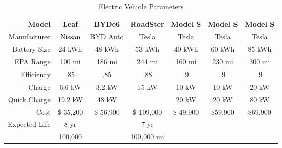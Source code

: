 \begin{table}
\centering
\begin{tabular}{| r |  c c c c c c |}
\hline
\rowcolor[gray]{.8} \bf Model		&	\bf Leaf  		& \bf	 BYDe6   	& 	\bf RoadSter  	& \bf Model S 		&  \bf Model S  & \bf  Model S 	 \\
\hline
 Manufacturer 	&	Nissan		& 	BYD Auto	&	Tesla		&	Tesla		&	Tesla		&	Tesla  	\\
\rowcolor[gray]{.95}Battery Size	&	24 kWh	&	 48 kWh	&	 53 kWh	&	40 kWh	&	60 kWh	&	85 kWh	\\
EPA Range	&	100 mi 		&	186 mi 		&	244 mi  	&	160 mi 		&	230 mi		&	300 mi 		\\
\rowcolor[gray]{.95}Efficiency	&	.85		&	.85		&	.88		&	.9		&	.9		&	.9		\\
Charge		&	6.6 kW		&	3.2 kW		&	15 kW		&	10 kW		&	10 kW		&	20 kW		\\
\rowcolor[gray]{.95}Quick Charge	&	19.2 kW	&	48 kW		&			&	20 kW		&	20 kW		&	80 kW		\\
Cost		&	\$ 35,200	&	\$ 56,900	&	\$ 109,000	&	\$ 49,900	&	\$59,900	&	\$69,900	\\
\rowcolor[gray]{.95}Expected Life	&	8 yr 		&			&	7 yr	 	&			&			&			\\
		&	100,000   	&			&	100,000 mi  	&			&			&	\\
\hline

\end{tabular}

\caption{ Electric Vehicle Parameters }
\label{tab:evp}
\end{table}